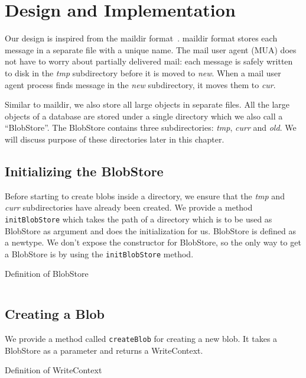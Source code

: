 \chapter{Design and Implementation}
\label{chap:design}

Our design is inspired from the maildir format~\cite{bernstein1995using}. maildir format stores each message in a separate file with a unique name. The mail user agent (MUA) does not have to worry about partially delivered mail: each message is safely written to disk in the \textit{tmp} subdirectory before it is moved to \textit{new}. When a mail user agent process finds message in the \textit{new} subdirectory, it moves them to \textit{cur}.

Similar to maildir, we also store all large objects in separate files. All the large objects of a database are stored under a single directory which we also call a ``BlobStore''.
The BlobStore contains three subdirectories: \textit{tmp}, \textit{curr} and \textit{old}. We will discuss purpose of these directories later in this chapter.

\section{Initializing the BlobStore}
Before starting to create blobs inside a directory, we ensure that the \textit{tmp} and \textit{curr} subdirectories have already been created. We provide a method \texttt{initBlobStore} which takes the path of a directory which is to be used as BlobStore as argument and does the initialization for us.
BlobStore is defined as a newtype. We don't expose the constructor for BlobStore, so the only way to get a BlobStore is by using the \texttt{initBlobStore} method.

\begin{program}
  \caption{Definition of BlobStore}
  \label{prog:defblobstore}
  \inputminted{haskell}{hs/blobstore.hs}
\end{program}

\section{Creating a Blob}
We provide a method called \texttt{createBlob} for creating a new blob. It takes a BlobStore as a parameter and returns a WriteContext.

\begin{program}
  \caption{Definition of WriteContext}
  \label{prog:defwritecontext}
  \inputminted{haskell}{hs/writecontext.hs}
\end{program}

